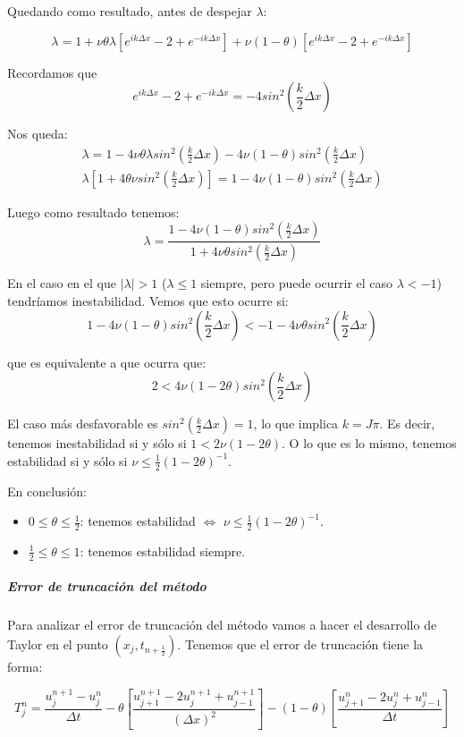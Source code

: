 Quedando como resultado, antes de despejar $\lambda$:

$$\lambda = 1+ \nu\theta\lambda\left[e^{ik\Delta x}-2+e^{-ik\Delta x}\right] + \nu(1-\theta)\left[e^{ik\Delta x} - 2 + e^{-ik\Delta x}\right]$$

Recordamos que
$$e^{ik\Delta x}-2+e^{-ik\Delta x} = -4sin^2\left(\frac{k}{2}\Delta x\right)$$

Nos queda:
\begin{align*}
\lambda = 1-4\nu\theta\lambda sin^2\left(\frac{k}{2}\Delta x\right)-4\nu(1-\theta)sin^2\left(\frac{k}{2}\Delta x\right)\\
\lambda\left[1+4\theta\nu sin^2\left(\frac{k}{2}\Delta x\right) \right] = 1 - 4\nu(1-\theta)sin^2\left(\frac{k}{2}\Delta x\right)
\end{align*}

Luego como resultado tenemos:
$$\lambda = \frac{1-4\nu(1-\theta)sin^2\left(\frac{k}{2}\Delta x\right)}{1+4\nu\theta sin^2\left(\frac{k}{2}\Delta x\right)}$$

En el caso en el que $|\lambda|> 1$ ($\lambda \le 1$ siempre, pero puede ocurrir el caso $\lambda < -1$) tendríamos inestabilidad. Vemos que esto ocurre si:
$$1-4\nu(1-\theta)sin^2\left(\frac{k}{2}\Delta x\right) < -1-4\nu\theta sin^2\left(\frac{k}{2}\Delta x\right)$$

que es equivalente a que ocurra que:
$$2 < 4\nu(1-2\theta)sin^2\left(\frac{k}{2}\Delta x\right)$$

El caso más desfavorable es $sin^2\left(\frac{k}{2}\Delta x\right) = 1$, lo que implica $k=J\pi$. Es decir, tenemos inestabilidad si y sólo si $1 < 2\nu(1-2\theta)$. O lo que es lo mismo, tenemos estabilidad si y sólo si $\nu\le \frac{1}{2}(1-2\theta)^{-1}$.

En conclusión:
\begin{itemize}
	\item $0\le\theta\le\frac{1}{2}$: tenemos estabilidad $\iff$ $\nu\le\frac{1}{2}(1-2\theta)^{-1}$.
	\item $\frac{1}{2}\le \theta \le 1$: tenemos estabilidad siempre.
\end{itemize}

\subparagraph{Error de truncación del método}\mbox{}

Para analizar el error de truncación del método vamos a hacer el desarrollo de Taylor en el punto $(x_j, t_{n+\frac{1}{2}})$. Tenemos que el error de truncación tiene la forma:

$$T_j^n = \frac{u_{j}^{n+1} - u_{j}^{n}}{\Delta t} - \theta\left[\frac{u_{j+1}^{n+1}-2u_{j}^{n+1}+u_{j-1}^{n+1}}{(\Delta x) ^2}\right] - (1-\theta)\left[\frac{u_{j+1}^{n}-2u_{j}^{n}+u_{j-1}^{n}}{\Delta t}\right]$$

